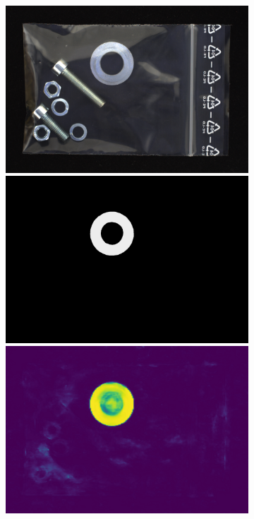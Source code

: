\begin{figure}[H]
\begin{subfigure}[b]{\textwidth}
\begin{minipage}{0.45\textwidth}
        \end{minipage}
        \begin{minipage}{0.45\textwidth}
            \centering
            \includegraphics[width=\textwidth]{figures/appendix/appendix_DRAEM/SB/337.png}
            \includegraphics[width=\textwidth]{figures/appendix/appendix_DRAEM/SB/337_m.png}
            \includegraphics[width=\textwidth]{figures/appendix/appendix_DRAEM/SB/337_mask.png}
        \end{minipage}
    \end{subfigure}


\end{figure}
